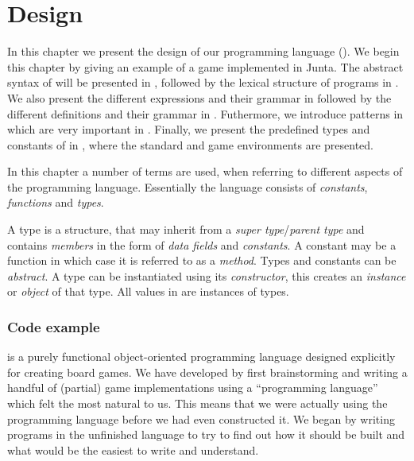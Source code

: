 \chapter{Design}
\label{chap:design}

In this chapter we present the design of our programming language
(\productname{}). We begin this chapter by giving an example of a game implemented in Junta. 
The abstract syntax of \productname{} will be presented in
, followed by the lexical structure of programs in
. We also present the different expressions and
their grammar in  followed by the different definitions
and their grammar in . Futhermore, we introduce patterns
in  which are very important in \productname{}.  Finally,
we present the predefined types and constants of \productname{} in
, where the standard and game environments are presented.

In this chapter a number of terms are used, when referring to different aspects
of the programming language. Essentially the language consists of
\emph{constants}, \emph{functions} and \emph{types}.

A type is a structure, that may inherit from a \emph{super
type}/\emph{parent type} and contains \emph{members} in the form of \emph{data
fields} and \emph{constants}. A constant may be a function in which case it is
referred to as a \emph{method}. Types and constants can be \emph{abstract}. A
type can be instantiated using its \emph{constructor}, this creates an
\emph{instance} or \emph{object} of that type. All values in \productname{} are
instances of types.

\subsection*{Code example}
\label{codesample}

\productname{} is a purely functional object-oriented programming language
designed explicitly for creating board games. We have developed \productname{}
by first brainstorming and writing a handful of (partial) game implementations using a
``programming language'' which felt the most natural to us. This means that we 
were actually using the programming language before we had even constructed
it. We began by writing programs in the unfinished language to try to find out
how it should be built and what would be the easiest to write and understand. 

